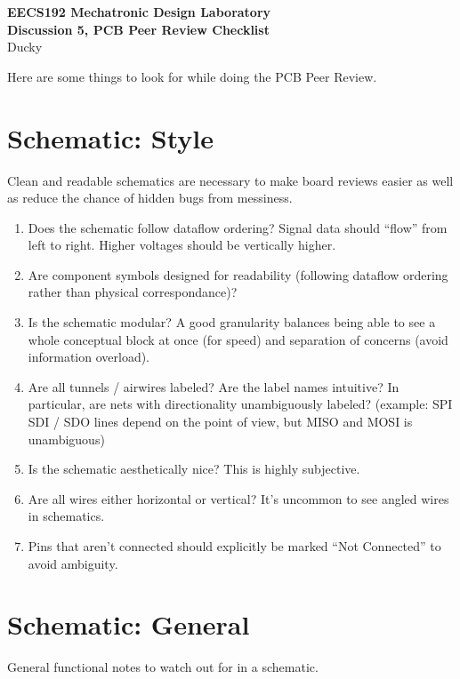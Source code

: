 \documentclass{article}
\begin{document}
{\centering \Large \bf EECS192 Mechatronic Design Laboratory \\}
{\centering \bf Discussion 5, PCB Peer Review Checklist \\}
{\centering Ducky \\}

Here are some things to look for while doing the PCB Peer Review.

\section{Schematic: Style}
Clean and readable schematics are necessary to make board reviews easier as well as reduce the chance of hidden bugs from messiness.

\begin{enumerate}
  \item Does the schematic follow dataflow ordering? Signal data should ``flow'' from left to right. Higher voltages should be vertically higher.
  \item Are component symbols designed for readability (following dataflow ordering rather than physical correspondance)?
  \item Is the schematic modular? A good granularity balances being able to see a whole conceptual block at once (for speed) and separation of concerns (avoid information overload).
  \item Are all tunnels / airwires labeled? Are the label names intuitive? In particular, are nets with directionality unambiguously labeled? (example: SPI SDI / SDO lines depend on the point of view, but MISO and MOSI is unambiguous)
  \item Is the schematic aesthetically nice? This is highly subjective.
  \item Are all wires either horizontal or vertical? It's uncommon to see angled wires in schematics.
  \item Pins that aren't connected should explicitly be marked ``Not Connected'' to avoid ambiguity.
\end{enumerate}

\section{Schematic: General}
General functional notes to watch out for in a schematic.
\end{document}
